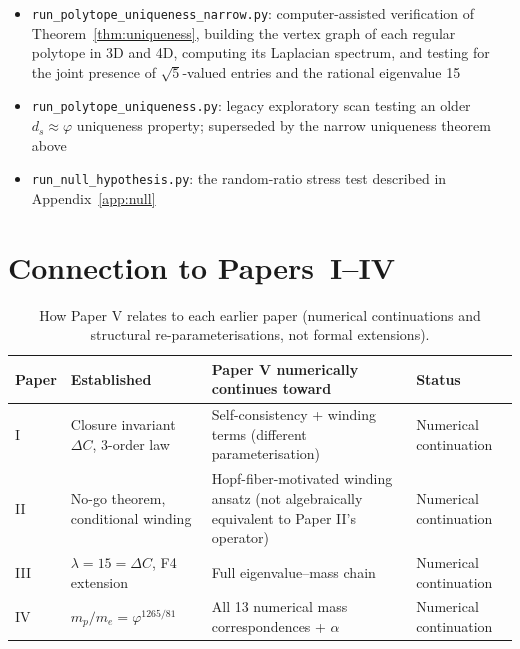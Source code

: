 \documentclass[12pt]{article}
\newcommand{\phig}{\varphi}
\begin{document}
\begin{itemize}
    \item \texttt{run\_polytope\_uniqueness\_narrow.py}: computer-assisted verification of Theorem~\ref{thm:uniqueness}, building the vertex graph of each regular polytope in 3D and 4D, computing its Laplacian spectrum, and testing for the joint presence of $\sqrt{5}$-valued entries and the rational eigenvalue 15
    \item \texttt{run\_polytope\_uniqueness.py}: legacy exploratory scan testing an older $d_s \approx \phig$ uniqueness property; superseded by the narrow uniqueness theorem above
    \item \texttt{run\_null\_hypothesis.py}: the random-ratio stress test described in Appendix~\ref{app:null}
\end{itemize}

\section{Connection to Papers~I--IV}\label{sec:connection}

\begin{table}[ht]
\centering
\caption{How Paper V relates to each earlier paper (numerical continuations and structural re-parameterisations, not formal extensions).}
\label{tab:connection}
\begin{tabular}{@{}llll@{}}
\toprule
Paper & Established & Paper V numerically continues toward & Status \\
\midrule
I & Closure invariant $\Delta C$, 3-order law & Self-consistency + winding terms (different parameterisation) & Numerical continuation \\
II & No-go theorem, conditional winding & Hopf-fiber-motivated winding ansatz (not algebraically equivalent to Paper II's operator) & Numerical continuation \\
III & $\lambda = 15 = \Delta C$, F4 extension & Full eigenvalue--mass chain & Numerical continuation \\
IV & $m_p/m_e = \phig^{1265/81}$ & All 13 numerical mass correspondences + $\alpha$ & Numerical continuation \\
\bottomrule
\end{tabular}
\end{table}
\end{document}
